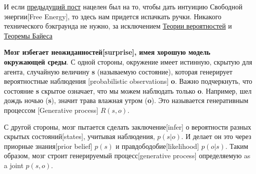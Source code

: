 \documentclass[twoside,leqno, 11pt]{article}
\begin{document}
	И если \href{https://medium.com/@solopchuk/intuitions-on-predictive-coding-and-the-free-energy-principle-3fc5bcedc754}{предыдущий пост} нацелен был на то, чтобы дать интуицию Свободной энергии[Free Energy], то здесь нам придется испачкать ручки. Никакого технического бэкграунда не нужно, за исключением \href{https://www.mathsisfun.com/data/probability.html}{Теории вероятностей} и \href{https://www.mathsisfun.com/data/bayes-theorem.html}{Теоремы Байеса}

	\textbf{Мозг избегает неожиданностей[surprise], имея хорошую модель окружающей среды}. С одной стороны, окружение имеет истинную, скрытую для агента, случайную величину \textbf{s} (называемую состояние), которая генерирует вероятностные наблюдения [probabilistic observations] \textbf{o}. Важно подчеркнуть, что состояние \textbf{s} скрытое означает, что мы можем наблюдать только \textbf{o}. Например, шел дождь ночью (\textbf{s}), значит трава влажная утром (\textbf{o}). Это называется генеративным процессом [Generative process] $R(s,o)$.
	
	\begin{figure}[h]
		\label{ris:image}
	\end{figure}
	
	С другой стороны, мозг пытается сделать заключение[infer] о вероятности разных скрытых состояний[states], учитывая наблюдения, $p(s|o)$. И делает он это через приорные знания[prior belief] $p(s)$ и правдободобие[likelihood] $p(o|s)$. Таким образом, мозг строит генерируемый процесс[generative process] определяемую as a joint $p(s,o)$.
	
	\newpage

	\begin{figure}[h!]
		\label{ris:image}
	\end{figure}
	
\end{document}
